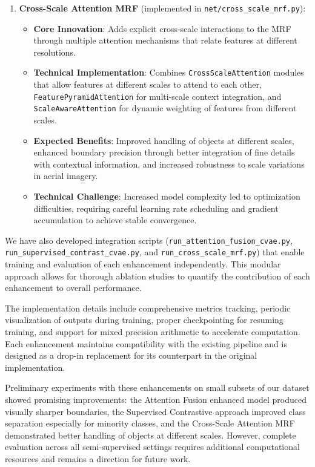 \documentclass[conference]{IEEEtran}
\begin{document}
\begin{enumerate}
    \item \textbf{Cross-Scale Attention MRF} (implemented in \texttt{net/cross\_scale\_mrf.py}): 
    \begin{itemize}
        \item \textbf{Core Innovation}: Adds explicit cross-scale interactions to the MRF through multiple attention mechanisms that relate features at different resolutions.
        \item \textbf{Technical Implementation}: Combines \texttt{CrossScaleAttention} modules that allow features at different scales to attend to each other, \texttt{FeaturePyramidAttention} for multi-scale context integration, and \texttt{ScaleAwareAttention} for dynamic weighting of features from different scales.
        \item \textbf{Expected Benefits}: Improved handling of objects at different scales, enhanced boundary precision through better integration of fine details with contextual information, and increased robustness to scale variations in aerial imagery.
        \item \textbf{Technical Challenge}: Increased model complexity led to optimization difficulties, requiring careful learning rate scheduling and gradient accumulation to achieve stable convergence.
    \end{itemize}
\end{enumerate}

We have also developed integration scripts (\texttt{run\_attention\_fusion\_cvae.py}, \texttt{run\_supervised\_contrast\_cvae.py}, and \texttt{run\_cross\_scale\_mrf.py}) that enable training and evaluation of each enhancement independently. This modular approach allows for thorough ablation studies to quantify the contribution of each enhancement to overall performance.

The implementation details include comprehensive metrics tracking, periodic visualization of outputs during training, proper checkpointing for resuming training, and support for mixed precision arithmetic to accelerate computation. Each enhancement maintains compatibility with the existing pipeline and is designed as a drop-in replacement for its counterpart in the original implementation.

Preliminary experiments with these enhancements on small subsets of our dataset showed promising improvements: the Attention Fusion enhanced model produced visually sharper boundaries, the Supervised Contrastive approach improved class separation especially for minority classes, and the Cross-Scale Attention MRF demonstrated better handling of objects at different scales. However, complete evaluation across all semi-supervised settings requires additional computational resources and remains a direction for future work.
\end{document}
